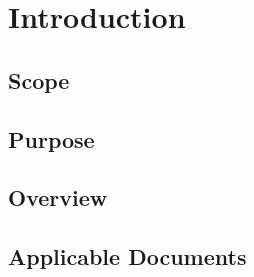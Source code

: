 %
\thispagestyle{fancy}
\chapter{Introduction}
\label{chp:intro}


\section{Scope}

\section{Purpose}

\section{Overview}

\section{Applicable Documents}

